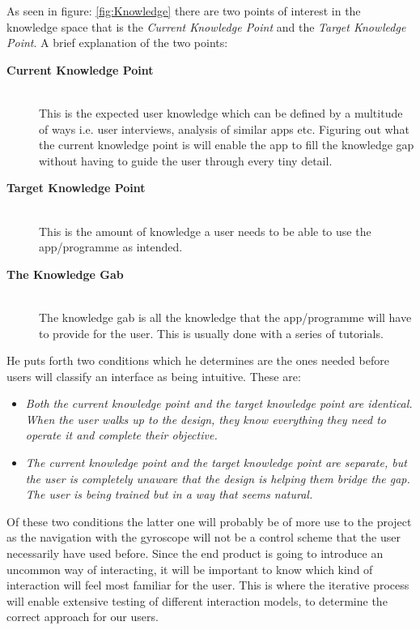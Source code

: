 As seen in figure: \ref{fig:Knowledge} there are two points of interest in the 
knowledge space that is the \textit{Current Knowledge Point} and the 
\textit{Target Knowledge Point}. A brief explanation of the two points:
\begin{description}
 \item[\textbf{Current Knowledge Point}] \hfill\\
This is the expected user knowledge which can be defined by a multitude of ways i.e. user interviews, analysis of similar apps etc. Figuring out what the 
current knowledge point is will enable the app to fill the knowledge gap without 
having to guide the user through every tiny detail. 
\item[\textbf{Target Knowledge Point}]\hfill\\
This is the amount of knowledge a user needs to be able to use the app/programme
as intended.
\item[\textbf{The Knowledge Gab}]\hfill\\
The knowledge gab is all the knowledge that the app/programme will have to 
provide for the user. This is usually done with a series of tutorials. 
\end{description}

He puts forth two conditions which he determines are the ones needed 
before users will classify an interface as being intuitive. These are:
\begin{itemize}
\item \textit{Both the current knowledge point and the target knowledge point are 
identical. When the user walks up to the design, they know everything they need 
to operate it and complete their objective.}
\item \textit{The current knowledge point and the target knowledge point are 
separate, but the user is completely unaware that the design is helping them bridge 
the gap. The user is being trained but in a way that seems natural.}
\end{itemize}\label{intuitiveConditions} 
Of these two conditions the latter one will probably be of more use to the 
project as the navigation with the gyroscope will not be a control scheme that 
the user necessarily  have used before. Since the end product is going to 
introduce an uncommon way of interacting, it will be important to know which kind 
of interaction will feel most familiar for the user. This is where the iterative 
process will enable extensive testing of different interaction models, to 
determine the correct approach for our users.
